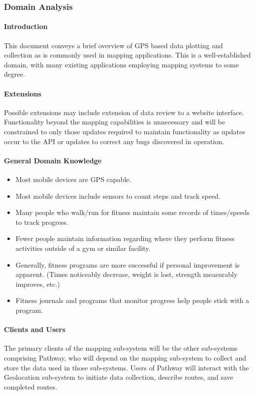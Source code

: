 ﻿\documentclass{article}
\begin{document}
\subsubsection{Domain Analysis}
\paragraph{Introduction}
This document conveys a brief overview of GPS based data plotting and collection as is commonly used in mapping applications. This is a well-established domain, with many existing applications employing mapping systems to some degree.

\paragraph{Extensions}
Possible extensions may include extension of data review to a website interface. Functionality beyond the mapping capabilities is unnecessary and will be constrained to only those updates required to maintain functionality as updates occur to the API or updates to correct any bugs discovered in operation.

\paragraph{General Domain Knowledge}
\begin{itemize}
    \item  Most mobile devices are GPS capable.
    \item Most mobile devices include sensors to count steps and track speed.
    \item Many people who walk/run for fitness maintain some records of times/speeds to track progress.
    \item Fewer people maintain information regarding where they perform fitness activities outside of a gym or similar facility.
    \item Generally, fitness programs are more successful if personal improvement is apparent. (Times noticeably decrease, weight is lost, strength measurably improves, etc.)
    \item Fitness journals and programs that monitor progress help people stick with a program.
\end{itemize}

\paragraph{Clients and Users}
The primary clients of the mapping sub-system will be the other sub-systems comprising Pathway, who will depend on the mapping sub-system to collect and store the data used in those sub-systems. Users of Pathway will interact with the Geolocation sub-system to initiate data collection, describe routes, and save completed routes.
\end{document}

